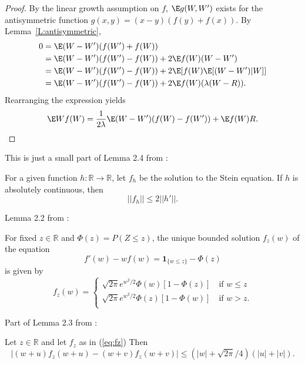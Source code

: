 \begin{proof}
  By the linear growth assumption on $f$, $\E g(W, W')$ exists for the antisymmetric function
  $g(x,y) = (x-y)(f(y)+f(x))$.  By Lemma~\ref{L:antisymmetric},
  \begin{equation*}
    \begin{split}
      0 &= \E (W-W')(f(W')+f(W)) \\
      &= \E (W-W')(f(W')-f(W)) + 2\E f(W)(W-W') \\
      &= \E (W-W')(f(W')-f(W)) + 2\E [f(W)\E [(W-W')|W]] \\
      &= \E (W-W')(f(W')-f(W)) + 2\E f(W)(\lambda (W-R)).
    \end{split}
  \end{equation*}
  Rearranging the expression yields
  \begin{equation}
    \E Wf(W) = \frac{1}{2\lambda} \E (W-W')(f(W)-f(W')) + \E f(W)R.
  \end{equation}
\end{proof}

This is just a small part of Lemma 2.4 from \cite{chen2010normal}:
\begin{lemma}
  \label{L:stein-eq-sol-bound}
  For a given function $h: \mathbb{R} \to \mathbb{R}$, let $f_h$ be the solution to the Stein
  equation.  If $h$ is absolutely continuous, then
  \begin{equation}
    ||f_h|| \leq 2 ||h'||.
  \end{equation}
\end{lemma}

Lemma 2.2 from \cite{chen2010normal}:
\begin{lemma}
  \label{L:stein-eq-sol}
  For fixed $z \in \mathbb{R}$ and $\Phi(z) = P(Z \leq z)$, the unique bounded solution
$f_z(w)$ of the equation
  \begin{equation}
    \label{eq:stein-eq}
    f'(w) - wf(w) = \mathbf{1}_{\{w \leq z\}} - \Phi(z)
  \end{equation}
  is given by
  \begin{equation}
    \label{eq:fz}
    f_z(w) =
    \begin{cases}
      \sqrt{2 \pi} e^{w^2/2} \Phi(w)[1-\Phi(z)] \quad \text{if } w \leq z \\
      \sqrt{2 \pi} e^{w^2/2} \Phi(z)[1-\Phi(w)] \quad \text{if } w > z. \\
    \end{cases}
  \end{equation}
\end{lemma}

Part of Lemma 2.3 from \cite{chen2010normal}:
\begin{lemma}
  \label{L:stein-eq-sol-bound2}
  Let $z \in \mathbb{R}$ and let $f_z$ as in (\ref{eq:fz})
    Then
    \begin{equation*}
      |(w + u)f_z(w + u) - (w + v)f_z(w + v)| \leq
      (|w| + \sqrt{2 \pi} / 4)(|u| + |v|).
    \end{equation*}
\end{lemma}


